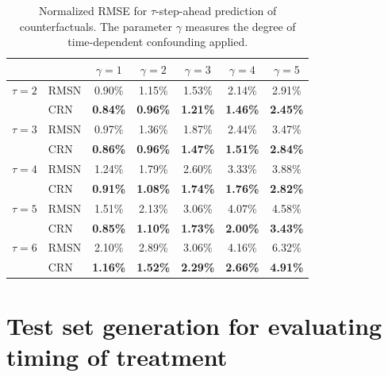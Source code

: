 \documentclass{article} %
\begin{document}
		\begin{table}[ht]
		\caption{Normalized RMSE for $\tau$-step-ahead prediction of counterfactuals. The parameter $\gamma$ measures the degree of time-dependent confounding applied.  }
		\label{tab:results_sequence_prediction}
		\vskip 0.15in
		\begin{center}
			\begin{small}
				\begin{tabular}{clccccc}
					\toprule
					& & $\gamma=1$ & $\gamma=2$ & $\gamma=3$  & $\gamma=4$ & $\gamma=5$ \\
					\hline
					\hline
					$\tau=2$& RMSN &  0.90\%  & 1.15\% & 1.53\% & 2.14\% & 2.91\% \\
					& CRN &   \textbf{0.84\%}  & \textbf{0.96\%} &\textbf{ 1.21\%} & \textbf{1.46\%} &\textbf{ 2.45\%}  \\
					\midrule
					$\tau=3$& RMSN &  0.97\%  & 1.36\% & 1.87\% & 2.44\% & 3.47\% \\
					& CRN &   \textbf{0.86\%}  & \textbf{0.96\%} &\textbf{ 1.47\%} & \textbf{1.51\%} &\textbf{ 2.84\%}  \\
					\midrule
					$\tau=4$& RMSN &  1.24\%  & 1.79\% & 2.60\% & 3.33\% & 3.88\% \\
					& CRN &   \textbf{0.91\%}  & \textbf{1.08\%} &\textbf{ 1.74\%} & \textbf{1.76\%} &\textbf{ 2.82\%}  \\
					\midrule
					$\tau=5$& RMSN &  1.51\%  & 2.13\% & 3.06\% & 4.07\% & 4.58\% \\
					& CRN &   \textbf{0.85\%}  & \textbf{1.10\%} &\textbf{ 1.73\%} & \textbf{2.00\%} &\textbf{ 3.43\%}  \\
					\midrule
					$\tau=6$& RMSN &  2.10\%  & 2.89\% & 3.06\% & 4.16\% & 6.32\% \\
					& CRN &   \textbf{1.16\%}  & \textbf{1.52\%} &\textbf{2.29\%} & \textbf{2.66\%} &\textbf{ 4.91\%}  \\
					\bottomrule
				\end{tabular}
			\end{small}
		\end{center}
		\vskip -0.1in
	\end{table}
	
	\newpage
	
	\section{Test set generation for evaluating timing of treatment} \label{apx:test_set_timing}
	
\end{document}
